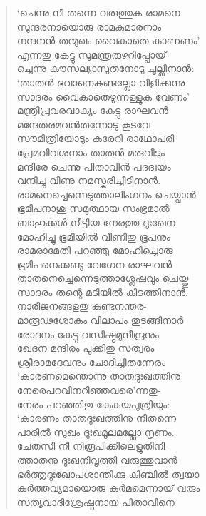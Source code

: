 \begin{verse}
‘ചെന്നു നീ തന്നെ വരുത്തുക രാമനെ\\
സുന്ദരനായൊരു രാമകുമാരനാം\\
നന്ദനന്‍ തന്മുഖം വൈകാതെ കാണണം’\\
എന്നതു കേട്ടു സുമന്ത്രരുഴറിപ്പോയ്-\\
ച്ചെന്നു കൗസല്യാസുതനോടു ചൂല്ലിനാന്‍:\\
‘താതന്‍ ഭവാനെകുണ്ടല്ലോ വിളിക്കുന്നു\\
സാദരം വൈകാതെഴുന്നള്ളുക വേണം’\\
മന്ത്രിപ്രവരവാക്യം കേട്ടു രാഘവന്‍\\
മന്ദേതരമവന്‍തന്നോടു കൂടവേ\\
സൗമിത്രിയോടും കരേറി രാഥോപരി\\
പ്രേമവിവശനാം താതന്‍ മരുവീടും\\
മന്ദിരേ ചെന്നു പിതാവിന്‍ പദദ്വയം\\
വന്ദിച്ചു വീണു നമസ്കരിച്ചീടിനാന്‍.\\
രാമനെച്ചെന്നെടുത്താലിംഗനം ചെയ്വാന്‍\\
ഭൂമിപനാശു സമുത്ഥായ സംഭ്രമാല്‍\\
ബാഹുക്കള്‍ നീട്ടിയ നേരത്തു ദുഃഖേന\\
മോഹിച്ചു ഭൂമിയില്‍ വീണിതു ഭൂപനും\\
രാമരാമേതി പറഞ്ഞു മോഹിച്ചൊരു\\
ഭൂമിപനെക്കണ്ടു വേഗേന രാഘവന്‍\\
താതനെച്ചെന്നെടുത്താശ്ലേഷവും ചെയ്തു\\
സാദരം തന്റെ മടിയില്‍ കിടത്തിനാന്‍.\\
നാരീജനങ്ങളതു കണ്ടനന്തര-\\
മാരൂഢശോകം വിലാപം തുടങ്ങിനാര്‍\\
രോദനം കേട്ടു വസിഷ്ഠമുനീന്ദ്രനും\\
ഖേദന മന്ദിരം പുക്കിതു സത്വരം\\
ശ്രീരാമദേവനും ചോദിച്ചിതന്നേരം\\
‘കാരണമെന്തൊന്നു താതദുഃഖത്തിനു\\
നേരെപറവിനറിഞ്ഞവരെ’ന്നതു-\\
നേരം പറഞ്ഞിതു കേകയപുത്രിയും:\\
‘കാരണം താതദുഃഖത്തിനു നീതന്നെ\\
പാരില്‍ സുഖം ദുഃഖമൂലമല്ലോ നൃണം.\\
ചേതസി നീ നിരൂപിക്കിലെളുതിനി-\\
ത്താതനു ദുഃഖനിവൃത്തി വരുത്തുവാന്‍\\
ഭര്‍ത്തൃദുഃഖോപശാന്തിക്കു കിഞ്ചില്‍ ത്വയാ\\
കര്‍ത്തവ്യമായൊരു കര്‍മമെന്നായ് വരും\\
സത്യവാദിശ്രേഷ്ഠനായ പിതാവിനെ\\

\end{verse}
